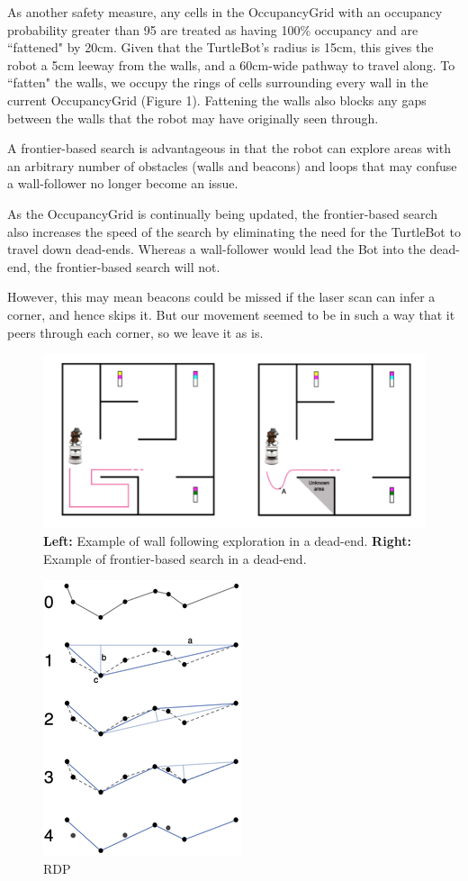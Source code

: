 \documentclass[titlepage,12pt,a4paper]{article}
\begin{document}
As another safety measure, any cells in the OccupancyGrid with an occupancy probability greater than 95 are treated as having 100\% occupancy and are ``fattened" by 20cm. Given that the TurtleBot's radius is 15cm, this gives the robot a 5cm leeway from the walls, and a 60cm-wide pathway to travel along. To ``fatten" the walls, we occupy the rings of cells surrounding every wall in the current OccupancyGrid (Figure 1). Fattening the walls also blocks any gaps between the walls that the robot may have originally seen through. 

A frontier-based search is advantageous in that the robot can explore areas with an arbitrary number of obstacles (walls and beacons) and loops that may confuse a wall-follower no longer become an issue. 

As the OccupancyGrid is continually being updated, the frontier-based search also increases the speed of the search by eliminating the need for the TurtleBot to travel down dead-ends. Whereas a wall-follower would lead the Bot into the dead-end, the frontier-based search will not. 

However, this may mean beacons could be missed if the laser scan can infer a corner, and hence skips it. But our movement seemed to be in such a way that it peers through each corner, so we leave it as is.

\begin{figure}[h]
	\centering
	\includegraphics[scale=0.7]{paths.png}
	\caption{\textbf{Left:} Example of wall following exploration in a dead-end. \textbf{Right:} Example of frontier-based search in a dead-end.}
\end{figure}

\pagebreak
\begin{figure}[h]
	\centering
	\includegraphics[scale=0.5]{rdp.png}
	\caption{RDP}
\end{figure}
	
\end{document}
